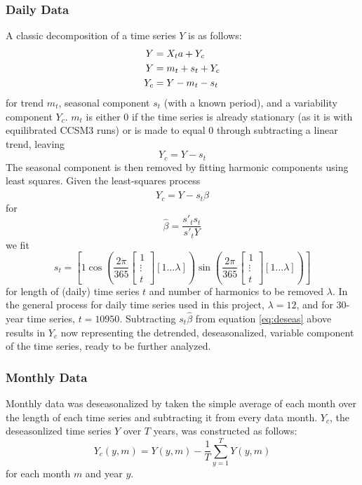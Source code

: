 \documentclass[11pt]{amsart}
\begin{document}
\subsubsection{Daily Data} %
A classic decomposition of a time series $Y$ is as follows: 
\begin{equation}
\begin{aligned}\centering
Y &= X_ta + Y_c \\
Y &= m_t + s_t + Y_c \\ 
Y_c &= Y - m_t - s_t 
\end{aligned}\end{equation}
for trend $m_t$, seasonal component $s_t$ (with a known period), and a variability component $Y_c$. $m_t$ is either $0$ if the time series is already stationary (as it is with equilibrated CCSM3 runs) or is made to equal $0$ through subtracting a linear trend, leaving
\begin{equation}
Y_c = Y-s_t
\end{equation}
The seasonal component is then removed by fitting harmonic components using least squares. Given the least-squares process
\begin{equation}Y_c = Y-s_t\hat{\beta}\label{eq:deseas}\end{equation}
for 
$$\hat{\beta} = \frac{s'_ts_t}{s'_tY}$$
we fit
\begin{equation}
s_t = \left[1 \cos\left(\frac{2\pi}{365}\left[\begin{matrix}1 \\ \vdots \\ t\end{matrix}\right][1 \hdots \lambda]\right) \sin\left(\frac{2\pi}{365}\left[\begin{matrix}1 \\ \vdots \\ t\end{matrix}\right][1 \hdots \lambda]\right) \right]
\end{equation}
for length of (daily) time series $t$ and number of harmonics to be removed $\lambda$. In the general process for daily time series used in this project, $\lambda = 12$, and for 30-year time series, $t = 10950$. Subtracting $s_t\hat{\beta}$ from equation \ref{eq:deseas} above results in $Y_c$ now representing the detrended, deseasonalized, variable component of the time series, ready to be further analyzed. 

\subsubsection{Monthly Data} %
Monthly data was deseasonalized by taken the simple average of each month over the length of each time series and subtracting it from every data month. $Y_c$, the deseasonlized time series $Y$ over $T$ years, was constructed as follows: 
\begin{equation}
Y_c(y,m) = Y(y,m) - \frac{1}{T}\sum_{y=1}^T Y(y,m)
\end{equation}
for each month $m$ and year $y$.
\end{document}
